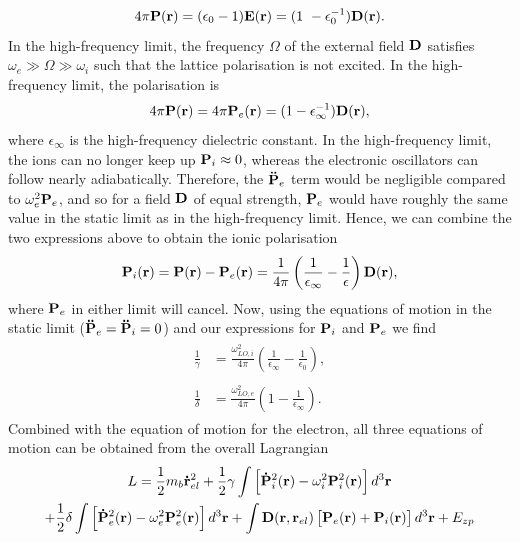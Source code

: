 \begin{equation}
    4\pi \vb{P}(\vb{r}) = (\epsilon_0 - 1) \vb{E}(\vb{r}) = (1\ - \epsilon_0^{-1}) \vb{D}(\vb{r}).
\label{eqn-2121-9}
\end{equation}
In the high-frequency limit, the frequency $\Omega$ of the external field $\vb{D}$ satisfies $\omega_e \gg \Omega \gg \omega_i$ such that the lattice polarisation is not excited. In the high-frequency limit, the polarisation is
\begin{equation}
    4\pi\vb{P}(\vb{r}) = 4\pi\vb{P}_e(\vb{r}) = (1 - \epsilon_\infty^{-1}) \vb{D}(\vb{r}),
\label{eqn-2121-10}
\end{equation}
where $\epsilon_\infty$ is the high-frequency dielectric constant. In the high-frequency limit, the ions can no longer keep up $\vb{P}_{i} \approx 0$, whereas the electronic oscillators can follow nearly adiabatically. Therefore, the $\vb{\ddot{P}}_{e}$ term would be negligible compared to $\omega^2_{e} \vb{P}_{e}$, and so for a field $\vb{D}$ of equal strength, $\vb{P}_e$ would have roughly the same value in the static limit as in the high-frequency limit. Hence, we can combine the two expressions above to obtain the ionic polarisation
\begin{equation}
    \vb{P}_i(\vb{r}) = \vb{P}(\vb{r}) - \vb{P}_e(\vb{r}) = \frac{1}{4\pi} \left(\frac{1}{\epsilon_\infty} - \frac{1}{\epsilon} \right) \vb{D}(\vb{r}),
\label{eqn-2121-11}
\end{equation}
where $\vb{P}_e$ in either limit will cancel. Now, using the equations of motion in the static limit ($\vb{\ddot{P}}_{e} = \vb{\ddot{P}}_{i} = 0$) and our expressions for $\vb{P}_i$ and $\vb{P}_e$ we find
\begin{subequations}
\begin{align}
    \begin{split}
        \frac{1}{\gamma} &= \frac{\omega_{LO, i}^2}{4\pi} \left(\frac{1}{\epsilon_\infty} - \frac{1}{\epsilon_0} \right),
    \end{split}\\
    \begin{split}
        \frac{1}{\delta} &= \frac{\omega_{LO, e}^2}{4\pi} \left(1 - \frac{1}{\epsilon_\infty} \right).
    \end{split}
\end{align}
\label{eqn-2121-12}
\end{subequations}
Combined with the equation of motion for the electron, all three equations of motion can be obtained from the overall Lagrangian
\begin{equation}
\begin{gathered}
    L = \frac{1}{2} m_b \vb{\dot{r}}_{el}^2 + \frac{1}{2} \gamma \int \left[ \vb{\dot{P}}_{i}^2(\vb{r}) - \omega_i^2 \vb{P}^2_i (\vb{r}) \right] d^3 \vb{r} \\
    + \frac{1}{2} \delta \int \left[ \vb{\dot{P}}_{e}^2(\vb{r}) - \omega_e^2 \vb{P}^2_e (\vb{r}) \right] d^3 \vb{r} + \int \vb{D}(\vb{r}, \vb{r}_{el})\left[\vb{P}_e(\vb{r})+\vb{P}_i(\vb{r})\right] d^3\vb{r} + E_{zp}
\end{gathered}
\label{eqn-2121-13}
\end{equation}
